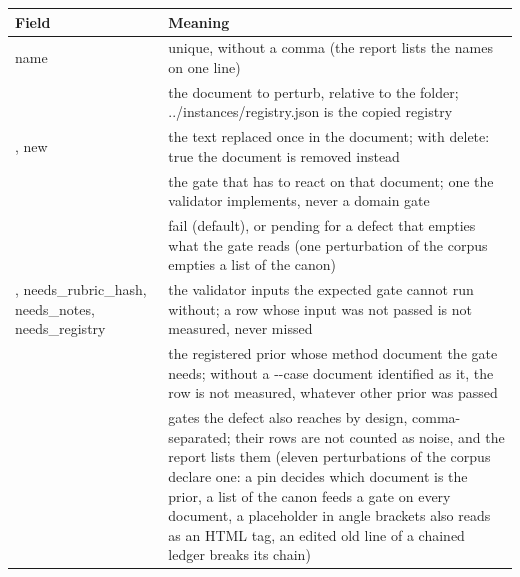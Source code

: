 \documentclass[
  american,
  10pt,
]{report}
\newcounter{none} %
\renewcommand{\texttt}[1]{{\ttfamily\hyphenchar\font=-1 #1}}
\begin{document}
{\def\LTcaptype{none} %
\begin{longtable}[]{@{}
  >{\raggedright\arraybackslash}p{}
  >{\raggedright\arraybackslash}p{}@{}}
\toprule\noalign{}
\begin{minipage}[b]{\linewidth}\raggedright
Field
\end{minipage} & \begin{minipage}[b]{\linewidth}\raggedright
Meaning
\end{minipage} \\
\midrule\noalign{}
\endhead
\bottomrule\noalign{}
\endlastfoot
\texttt{name} & unique, without a comma (the report lists the names on
one line) \\
\texttt{document} & the document to perturb, relative to the folder;
\texttt{.\allowbreak{}.\allowbreak{}/\allowbreak{}instances/\allowbreak{}registry.\allowbreak{}json}
is the copied registry \\
\texttt{old}, \texttt{new} & the text replaced once in the document;
with \texttt{delete:\allowbreak{} true} the document is removed
instead \\
\texttt{gate} & the gate that has to react on that document; one the
validator implements, never a domain gate \\
\texttt{expect} & \texttt{fail} (default), or \texttt{pending} for a
defect that empties what the gate reads (one perturbation of the corpus
empties a list of the canon) \\
\texttt{needs\_\allowbreak{}case},
\texttt{needs\_\allowbreak{}rubric\_\allowbreak{}hash},
\texttt{needs\_\allowbreak{}notes},
\texttt{needs\_\allowbreak{}registry} & the validator inputs the
expected gate cannot run without; a row whose input was not passed is
not measured, never missed \\
\texttt{prior} & the registered prior whose method document the gate
needs; without a \texttt{-\allowbreak{}-\allowbreak{}case} document
identified as it, the row is not measured, whatever other prior was
passed \\
\texttt{also} & gates the defect also reaches by design,
comma-separated; their rows are not counted as noise, and the report
lists them (eleven perturbations of the corpus declare one: a pin
decides which document is the prior, a list of the canon feeds a gate on
every document, a placeholder in angle brackets also reads as an HTML
tag, an edited old line of a chained ledger breaks its chain) \\
\end{longtable}
}
\end{document}
